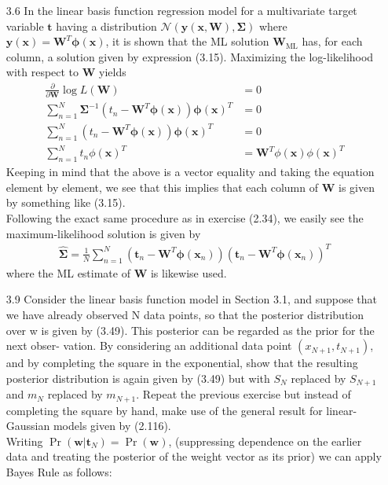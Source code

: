 \documentclass[]{article}
\begin{document}
\begin{enumerate}
	\item[3.6] In the linear basis function regression model for a multivariate target variable $\mathbf{t}$ having a distribution $\mathcal{N}(\mathbf{y}(\mathbf{x}, \mathbf{W}), \bm{\Sigma})$ where $\mathbf{y}(\mathbf{x})=\mathbf{W}^T\bm{\phi}(\mathbf{x})$, it is shown that the ML solution $\mathbf{W}_{\text{ML}}$ has, for each column, a solution given by expression (3.15). Maximizing the log-likelihood with respect to $\mathbf{W}$ yields
	\begin{align*}
	\frac{\partial}{\partial \mathbf{W}} \log L(\mathbf{W})&= 0 \\
	 \sum_{n=1}^{N} \bm{\Sigma}^{-1} (t_n - \mathbf{W}^T\bm{\phi}(\mathbf{x}))\bm{\phi}(\mathbf{x})^T&=0 \\
	 \sum_{n=1}^{N} (t_n - \mathbf{W}^T\bm{\phi}(\mathbf{x}))\bm{\phi}(\mathbf{x})^T&=0 \\
	 \sum_{n=1}^{N} t_n \phi(\mathbf{x})^T &= \mathbf{W}^T \phi(\mathbf{x})\phi(\mathbf{x})^T
	\end{align*}
	Keeping in mind that the above is a vector equality and taking the equation element by element, we see that this implies that each column of $\mathbf{W}$ is given by something like (3.15). \\
	Following the exact same procedure as in exercise (2.34), we easily see the maximum-likelihood solution is given by
	\begin{align*}
	\hat{\bm{\Sigma}} = \frac{1}{N} \sum_{n=1}^N (\mathbf{t}_n - \mathbf{W}^T\bm{\phi}(\mathbf{x}_n))(\mathbf{t}_n - \mathbf{W}^T\bm{\phi}(\mathbf{x}_n))^T
	\end{align*}
	where the ML estimate of $\mathbf{W}$ is likewise used.
	\item[3.9] Consider the linear basis function model in Section 3.1, and suppose that we have already observed N data points, so that the posterior distribution over w is given by (3.49). This posterior can be regarded as the prior for the next obser- vation. By considering an additional data point $(x_{N+1},t_{N+1})$, and by completing the square in the exponential, show that the resulting posterior distribution is again given by (3.49) but with $S_N$ replaced by $S_{N+1}$ and $m_N$ replaced by $m_{N+1}$. Repeat the previous exercise but instead of completing the square by hand, make use of the general result for linear-Gaussian models given by (2.116). \\
	Writing $\Pr(\mathbf{w}|\mathbf{t}_N)=\Pr(\mathbf{w})$, (suppressing dependence on the earlier data and treating the posterior of the weight vector as its prior) we can apply Bayes Rule as follows:

\end{enumerate}
\end{document}

